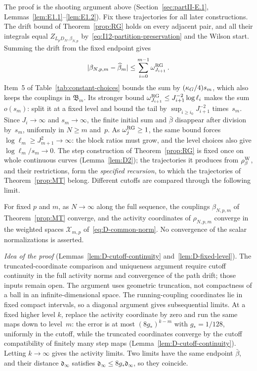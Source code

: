 The proof is the shooting argument above (Section~\ref{sec:partII-E.1}, Lemmas~\ref{lem:E1.1}--\ref{lem:E1.2}). Fix these trajectories for all later constructions. The drift bound of Theorem~\ref{prop:RG} holds on every adjacent pair, and all their integrals equal $Z_{L_pD_N,\beta_{N,p}}$ by~\eqref{eq:I12-partition-preservation} and the Wilson start. Summing the drift from the fixed endpoint gives
\begin{equation}\label{eq:I12-drift-sum}
|\beta_{N,p,m}-\widehat{\beta}_m|\le\sum_{i=0}^{m-1}\omega_{J_{i+1}}^{\rm RG}\,.
\end{equation}
Item~5 of Table~\ref{tab:constant-choices} bounds the sum by $(\kappa_G/4)s_m$, which also keeps the couplings in $\mathfrak B_m$. Its stronger bound $\omega_{J_{i+1}}^{\rm RG}\le J_{i+1}^{-2}\log\ell_i$ makes the sum $o(s_m)$: split it at a fixed level and bound the tail by $\sup_{i\ge i_0}J_{i+1}^{-2}$ times~$s_m$. Since $J_i\to\infty$ and $s_m\to\infty$, the finite initial sum and $\bar\beta$ disappear after division by~$s_m$, uniformly in $N\ge m$ and~$p$. As $\omega_j^{\rm RG}\ge1$, the same bound forces $\log\ell_m\ge J_{m+1}^2\to\infty$: the block ratios must grow, and the level choices also give $\log\ell_m/s_m\to0$. The step construction of Theorem~\ref{prop:RG} is fixed once on whole continuous curves (Lemma~\ref{lem:D2}); the trajectories it produces from $\rho^{\rm W}_\beta$, and their restrictions, form the \emph{specified recursion}, to which the trajectories of Theorem~\ref{prop:MT} belong. Different cutoffs are compared through the following limit.

\begin{proposition}\label{prop:fixed-level}
For fixed $p$ and $m$, as $N\to\infty$ along the full sequence, the couplings $\beta_{N,p,m}$ of
Theorem~\ref{prop:MT} converge, and the activity coordinates of $\rho_{N,p,m}$ converge in the
weighted spaces $\mathcal X_{m,p}$ of~\eqref{eq:D-common-norm}. No convergence of the scalar normalizations is asserted.
\end{proposition}

\emph{Idea of the proof} (Lemmas~\ref{lem:D-cutoff-continuity} and~\ref{lem:D-fixed-level}). The truncated-coordinate comparison and uniqueness argument require cutoff continuity in the full activity norms and convergence of the path drift; those inputs remain open. The argument uses geometric truncation, not compactness of a ball in an infinite-dimensional space. The running-coupling coordinates lie in fixed compact intervals, so a diagonal argument gives subsequential limits. At a fixed higher level $k$, replace the activity coordinate by zero and run the same maps down to level~$m$: the error is at most $(8g_*)^{k-m}$ with $g_*=1/128$, uniformly in the cutoff, while the truncated coordinates converge by the cutoff compatibility of finitely many step maps (Lemma~\ref{lem:D-cutoff-continuity}). Letting $k\to\infty$ gives the activity limits. Two limits have the same endpoint $\bar\beta$, and their distance $\mathfrak d_\infty$ satisfies $\mathfrak d_\infty\le8g_*\mathfrak d_\infty$, so they coincide.

